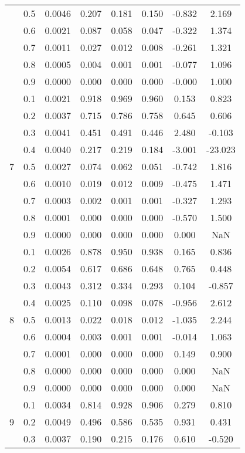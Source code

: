 \documentclass[11pt,a4paper]{report}
\begin{document}
\begin{longtable}{ | c | c || c | c | c | c | c | c | }
 & 0.5 & 0.0046 & 0.207 & 0.181 & 0.150 & -0.832 & 2.169 \\
 & 0.6 & 0.0021 & 0.087 & 0.058 & 0.047 & -0.322 & 1.374 \\
 & 0.7 & 0.0011 & 0.027 & 0.012 & 0.008 & -0.261 & 1.321 \\
 & 0.8 & 0.0005 & 0.004 & 0.001 & 0.001 & -0.077 & 1.096 \\
 & 0.9 & 0.0000 & 0.000 & 0.000 & 0.000 & -0.000 & 1.000 \\
 \hline
\multirow{9}{*}{7} & 0.1 & 0.0021 & 0.918 & 0.969 & 0.960 & 0.153 & 0.823 \\
 & 0.2 & 0.0037 & 0.715 & 0.786 & 0.758 & 0.645 & 0.606 \\
 & 0.3 & 0.0041 & 0.451 & 0.491 & 0.446 & 2.480 & -0.103 \\
 & 0.4 & 0.0040 & 0.217 & 0.219 & 0.184 & -3.001 & -23.023 \\
 & 0.5 & 0.0027 & 0.074 & 0.062 & 0.051 & -0.742 & 1.816 \\
 & 0.6 & 0.0010 & 0.019 & 0.012 & 0.009 & -0.475 & 1.471 \\
 & 0.7 & 0.0003 & 0.002 & 0.001 & 0.001 & -0.327 & 1.293 \\
 & 0.8 & 0.0001 & 0.000 & 0.000 & 0.000 & -0.570 & 1.500 \\
 & 0.9 & 0.0000 & 0.000 & 0.000 & 0.000 & 0.000 & NaN \\
 \hline
\multirow{9}{*}{8} & 0.1 & 0.0026 & 0.878 & 0.950 & 0.938 & 0.165 & 0.836 \\
 & 0.2 & 0.0054 & 0.617 & 0.686 & 0.648 & 0.765 & 0.448 \\
 & 0.3 & 0.0043 & 0.312 & 0.334 & 0.293 & 0.104 & -0.857 \\
 & 0.4 & 0.0025 & 0.110 & 0.098 & 0.078 & -0.956 & 2.612 \\
 & 0.5 & 0.0013 & 0.022 & 0.018 & 0.012 & -1.035 & 2.244 \\
 & 0.6 & 0.0004 & 0.003 & 0.001 & 0.001 & -0.014 & 1.063 \\
 & 0.7 & 0.0001 & 0.000 & 0.000 & 0.000 & 0.149 & 0.900 \\
 & 0.8 & 0.0000 & 0.000 & 0.000 & 0.000 & 0.000 & NaN \\
 & 0.9 & 0.0000 & 0.000 & 0.000 & 0.000 & 0.000 & NaN \\
 \hline
\multirow{9}{*}{9} & 0.1 & 0.0034 & 0.814 & 0.928 & 0.906 & 0.279 & 0.810 \\
 & 0.2 & 0.0049 & 0.496 & 0.586 & 0.535 & 0.931 & 0.431 \\
 & 0.3 & 0.0037 & 0.190 & 0.215 & 0.176 & 0.610 & -0.520 \\

\end{longtable}
\end{document}
